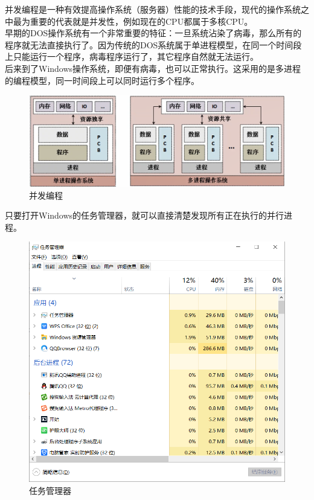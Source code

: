 并发编程是一种有效提高操作系统（服务器）性能的技术手段，现代的操作系统之中最为重要的代表就是并发性，例如现在的CPU都属于多核CPU。\\

早期的DOS操作系统有一个非常重要的特征：一旦系统沾染了病毒，那么所有的程序就无法直接执行了。因为传统的DOS系统属于单进程模型，在同一个时间段上只能运行一个程序，病毒程序运行了，其它程序自然就无法运行。\\

后来到了Windows操作系统，即便有病毒，也可以正常执行。这采用的是多进程的编程模型，同一时间段上可以同时运行多个程序。

\begin{figure}[H]
	\centering
	\includegraphics[scale=0.6]{img/C1/1-6/3.png}
	\caption{并发编程}
\end{figure}

只要打开Windows的任务管理器，就可以直接清楚发现所有正在执行的并行进程。

\begin{figure}[H]
	\centering
	\includegraphics[scale=0.7]{img/C1/1-6/4.png}
	\caption{任务管理器}
\end{figure}

